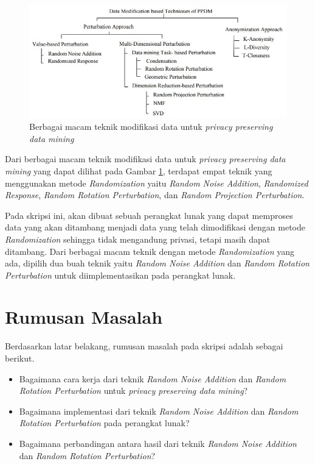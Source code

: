 \documentclass[a4paper,twoside]{article}
\begin{document}
\begin{figure}
	\centering
	\includegraphics[scale=0.785]{ppdm}
	\caption{Berbagai macam teknik modifikasi data untuk \textit{privacy preserving data mining}}
	\label{fig:ppdm}
\end{figure}

Dari berbagai macam teknik modifikasi data untuk \textit{privacy preserving data mining} yang dapat dilihat pada Gambar \ref{fig:ppdm}, terdapat empat teknik yang menggunakan metode \textit{Randomization} yaitu \textit{Random Noise Addition}, \textit{Randomized Response}, \textit{Random Rotation Perturbation}, dan \textit{Random Projection Perturbation}.

Pada skripsi ini, akan dibuat sebuah perangkat lunak yang dapat memproses data yang akan ditambang menjadi data yang telah dimodifikasi dengan metode \textit{Randomization} sehingga tidak mengandung privasi, tetapi masih dapat ditambang. Dari berbagai macam teknik dengan metode \textit{Randomization} yang ada, dipilih dua buah teknik yaitu \textit{Random Noise Addition} dan \textit{Random Rotation Perturbation} untuk diimplementasikan pada perangkat lunak.

\section{Rumusan Masalah}
Berdasarkan latar belakang, rumusan masalah pada skripsi adalah sebagai berikut.
\begin{itemize}
	\item Bagaimana cara kerja dari teknik \textit{Random Noise Addition} dan \textit{Random Rotation Perturbation} untuk \textit{privacy preserving data mining}?
	\item Bagaimana implementasi dari teknik \textit{Random Noise Addition} dan \textit{Random Rotation Perturbation} pada perangkat lunak?
	\item Bagaimana perbandingan antara hasil dari teknik \textit{Random Noise Addition} dan \textit{Random Rotation Perturbation}?
\end{itemize}
\end{document}
